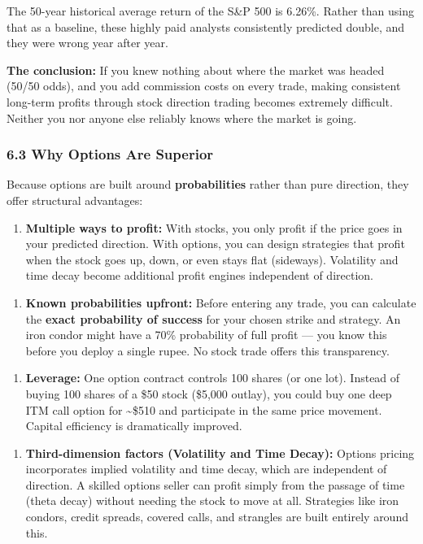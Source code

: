 \documentclass[12pt,openany]{book}
\begin{document}
The 50-year historical average return of the S\&P 500 is 6.26\%. Rather than using that as a baseline, these highly paid analysts consistently predicted double, and they were wrong year after year.

\textbf{The conclusion:} If you knew nothing about where the market was headed (50/50 odds), and you add commission costs on every trade, making consistent long-term profits through stock direction trading becomes extremely difficult. Neither you nor anyone else reliably knows where the market is going.

\subsubsection{6.3 Why Options Are Superior}

Because options are built around \textbf{probabilities} rather than pure direction, they offer structural advantages:

\begin{enumerate}[leftmargin=*]
    \item \textbf{Multiple ways to profit:} With stocks, you only profit if the price goes in your predicted direction. With options, you can design strategies that profit when the stock goes up, down, or even stays flat (sideways). Volatility and time decay become additional profit engines independent of direction.
\end{enumerate}

\begin{enumerate}[leftmargin=*]
    \item \textbf{Known probabilities upfront:} Before entering any trade, you can calculate the \textbf{exact probability of success} for your chosen strike and strategy. An iron condor might have a 70\% probability of full profit — you know this before you deploy a single rupee. No stock trade offers this transparency.
\end{enumerate}

\begin{enumerate}[leftmargin=*]
    \item \textbf{Leverage:} One option contract controls 100 shares (or one lot). Instead of buying 100 shares of a \$50 stock (\$5,000 outlay), you could buy one deep ITM call option for \textasciitilde{}\$510 and participate in the same price movement. Capital efficiency is dramatically improved.
\end{enumerate}

\begin{enumerate}[leftmargin=*]
    \item \textbf{Third-dimension factors (Volatility and Time Decay):} Options pricing incorporates implied volatility and time decay, which are independent of direction. A skilled options seller can profit simply from the passage of time (theta decay) without needing the stock to move at all. Strategies like iron condors, credit spreads, covered calls, and strangles are built entirely around this.
\end{enumerate}
\end{document}
